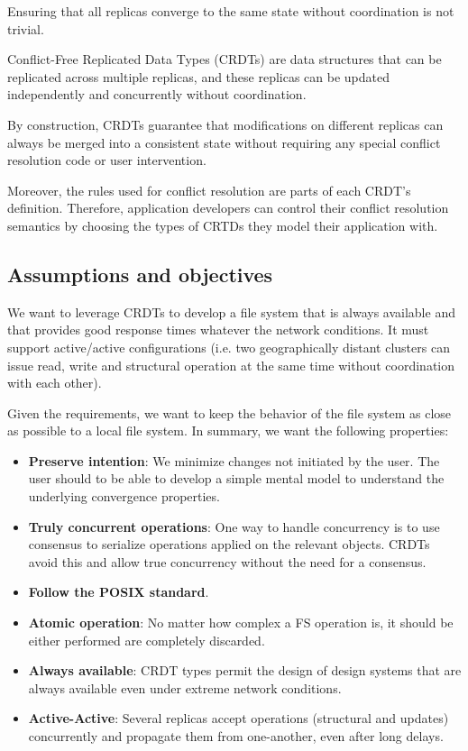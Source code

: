 \documentclass[sigconf,anonymous,10pt]{acmart}
\begin{document}
Ensuring that all replicas converge to the same state without coordination
is not trivial.

Conflict-Free Replicated Data Types (CRDTs) are data structures that
can be replicated across multiple replicas, and these replicas can be updated independently and concurrently without coordination.

By construction, CRDTs guarantee that modifications on different
replicas can always be merged into a consistent state without requiring
any special conflict resolution code or user intervention.

Moreover, the rules used for conflict resolution are parts of each CRDT's
definition.
Therefore, application developers can control their conflict resolution semantics by
choosing the types of CRTDs they model their application with.

\subsection{Assumptions and objectives}

We want to leverage CRDTs to develop a file system that is always available
and that provides good response times whatever the network conditions.
It must support active/active configurations
(i.e. two geographically distant clusters can issue read, write and structural
operation at the same time without coordination with each other).

Given the requirements, we want to keep the behavior of the file system as
close as possible to a local file system.
In summary, we want the following properties:

\begin{itemize}
	\item \textbf{Preserve intention}: We minimize changes not initiated by the user.
	The user should to be able to develop a simple mental model to understand
	the underlying convergence properties.
	\item \textbf{Truly concurrent operations}: One way to handle concurrency
	is to use consensus to serialize operations applied on the relevant objects.
	CRDTs avoid this and allow true concurrency without the need for
	a consensus.
	\item \textbf{Follow the POSIX standard}.
	\item \textbf{Atomic operation}: No matter how complex a FS operation is,
		  it should be either performed are completely discarded.
	\item \textbf{Always available}: CRDT types permit the design of design systems that
	are always available even under extreme network conditions.
	\item \textbf{Active-Active}: Several replicas accept operations
	(structural and updates) concurrently and propagate them from one-another,
	even after long delays.
\end{itemize}
\end{document}
